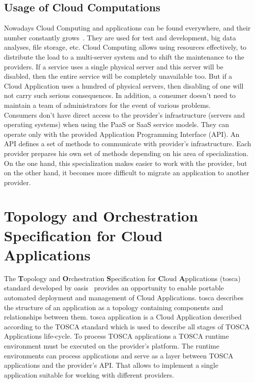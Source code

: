 \subsection*{Usage of Cloud Computations}
Nowadays Cloud Computing and applications can be found everywhere, and their number constantly grows~\cite*{cloud_stat}.
They are used for test and development, big data analyses, file storage, etc.
Cloud Computing allows using resources effectively, to distribute the load to a multi-server system and to shift the maintenance to the providers. 
If  a service uses a single physical server and this server will be disabled, then the entire service will be completely unavailable too.
But if a Cloud Application uses a hundred of physical servers, then disabling of one will not carry such serious consequences.
In addition, a consumer doesn't need to maintain a team of administrators for the event of various problems.\\
Consumers don't have direct access to the provider's infrastructure (servers and operating systems) when using the PaaS or SaaS service models. 
They can operate only with the provided Application Programming Interface (API).
An API defines a set of methods to communicate with provider's infrastructure. 
Each provider prepares his own set of methods depending on his area of specialization. 
On the one hand, this specialization makes easier to work with the provider, but on the other hand, it becomes more difficult to migrate an application to another provider.
\section{Topology and Orchestration Specification for Cloud	Applications} \label{sec:tosca}
The \textbf{T}opology and \textbf{O}rchestration \textbf{S}pecification for \textbf{C}loud \textbf{A}pplications (\gls{tosca}) standard developed by \gls{oasis}~\cite{oasis} provides an opportunity to enable portable automated deployment and management of Cloud Applications.
\gls{tosca} describes the structure of an application as a topology containing components and relationships between them.
\gls{tosca} application is a Cloud Application described according to the TOSCA standard which is used to describe all stages of TOSCA Applications life-cycle.
To process TOSCA applications a TOSCA runtime environment must be executed on the provider's platform. 
The runtime environments can process applications and serve as a layer between TOSCA applications and the provider's API.
That allows to implement a single application suitable for working with different providers. 
